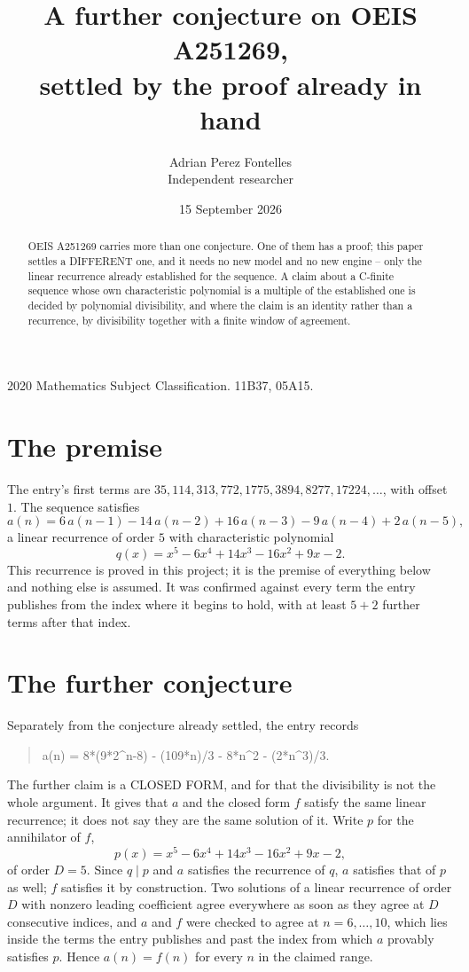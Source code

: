 \documentclass[11pt,a4paper]{article}
\title{A further conjecture on OEIS A251269,\\ \large settled by the proof already in hand}
\author{Adrian Perez Fontelles\\ \small Independent researcher}
\date{15 September 2026}
\theoremstyle{plain}
\theoremstyle{definition}
\begin{document}
\maketitle

\begin{abstract}
OEIS A251269 carries more than one conjecture. One of them has a proof; this paper settles a
DIFFERENT one, and it needs no new model and no new engine -- only the linear recurrence already
established for the sequence. A claim about a C-finite sequence whose own characteristic
polynomial is a multiple of the established one is decided by polynomial divisibility, and where
the claim is an identity rather than a recurrence, by divisibility together with a finite window
of agreement.
\end{abstract}

\noindent\small 2020 Mathematics Subject Classification. 11B37, 05A15.\normalsize

\section{The premise}

The entry's first terms are $35, 114, 313, 772, 1775, 3894, 8277, 17224,\dots$, with offset $1$. The sequence satisfies
\[
  a(n)=6\,a(n-1) - 14\,a(n-2) + 16\,a(n-3) - 9\,a(n-4) + 2\,a(n-5) ,
\]
a linear recurrence of order $5$ with characteristic polynomial
\[
  q(x)=x^{5} - 6 x^{4} + 14 x^{3} - 16 x^{2} + 9 x - 2 .
\]
This recurrence is proved in this project; it is the premise of everything below and nothing else is assumed.
It was confirmed against every term the entry publishes from the index where it begins to hold,
with at least $5+2$ further terms after that index.

\section{The further conjecture}

Separately from the conjecture already settled, the entry records

\begin{quote}\raggedright a(n) = 8*(9*2\^{}n-8) - (109*n)/3 - 8*n\^{}2 - (2*n\^{}3)/3.\end{quote}

The further claim is a CLOSED FORM, and for that the divisibility is not the whole argument. It
gives that $a$ and the closed form $f$ satisfy the same linear recurrence; it does not say they
are the same solution of it. Write $p$ for the annihilator of $f$,
\[
  p(x)=x^{5} - 6 x^{4} + 14 x^{3} - 16 x^{2} + 9 x - 2 ,
\]
of order $D=5$. Since $q\mid p$ and $a$ satisfies the recurrence of $q$, $a$ satisfies that of
$p$ as well; $f$ satisfies it by construction. Two solutions of a linear recurrence of order $D$
with nonzero leading coefficient agree everywhere as soon as they agree at $D$ consecutive
indices, and $a$ and $f$ were checked to agree at $n=6,\dots,10$,
which lies inside the terms the entry publishes and past the index from which $a$ provably
satisfies $p$. Hence $a(n)=f(n)$ for every $n$ in the claimed range.
\end{document}
